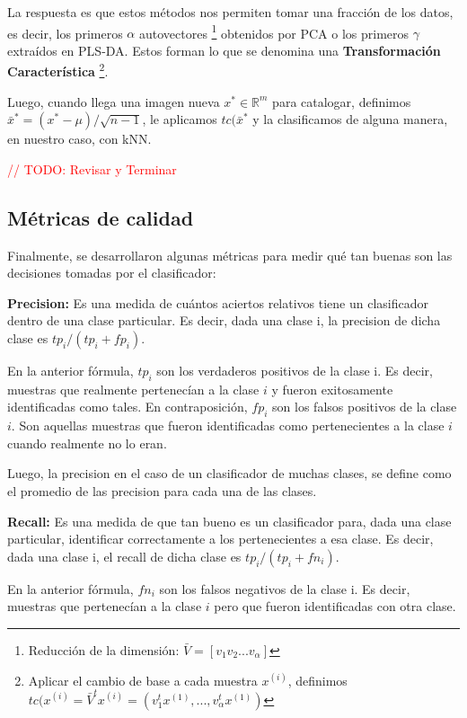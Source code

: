 La respuesta es que estos m\'etodos nos permiten tomar una fracci\'on de los datos, es decir, los primeros $\alpha$ autovectores \footnote{Reducci\'on de la dimensi\'on: $\bar{V} = [v_{1} v_{2} ... v_{\alpha}]$} obtenidos por PCA o los primeros $\gamma$ extra\'idos en PLS-DA. Estos forman lo que se denomina una \textbf{Transformaci\'on Caracter\'istica} \footnote{Aplicar el cambio de base a cada muestra $x^{(i)}$, definimos $tc(x^{(i)} = \bar{V}^{t}x^{(i)} = (v_{1}^{t}x^{(1)}, ..., v_{\alpha}^{t}x^{(1)})$}.

Luego, cuando llega una imagen nueva $x^{*} \in \mathbb{R}^{m}$ para catalogar, definimos $\bar{x}^{*} = (x^{*} - \mu)/\sqrt{n-1}$, le aplicamos $tc(\bar{x}^{*}$ y la clasificamos de alguna manera, en nuestro caso, con kNN.

\textcolor{red}{// TODO: Revisar y Terminar}

\subsection{M\'etricas de calidad}

Finalmente, se desarrollaron algunas m\'etricas para medir qu\'e tan buenas son las decisiones tomadas por el clasificador:

\textbf{Precision:} Es una medida de cu\'antos aciertos relativos tiene un clasificador dentro de una clase particular. Es decir, dada una clase i, la precision de dicha clase es $tp_{i} / (tp_{i} + fp_{i})$.

En la anterior f\'ormula, $tp_{i}$ son los verdaderos positivos de la clase i. Es decir, muestras que realmente pertenec\'ian a la clase $i$ y fueron exitosamente identificadas como tales. En contraposici\'on, $fp_{i}$ son los falsos positivos de la clase $i$. Son aquellas muestras que fueron identificadas como pertenecientes a la clase $i$ cuando realmente no lo eran.

Luego, la precision en el caso de un clasificador de muchas clases, se define como el promedio de las precision para cada una de las clases.

\textbf{Recall:} Es una medida de que tan bueno es un clasificador para, dada una clase particular, identificar correctamente a los pertenecientes a esa clase. Es decir, dada una clase i, el recall de dicha clase es $tp_{i} / (tp_{i} + fn_{i})$.

En la anterior f\'ormula, $fn_{i}$ son los falsos negativos de la clase i. Es decir, muestras que pertenec\'ian a la clase $i$ pero que fueron identificadas con otra clase.

